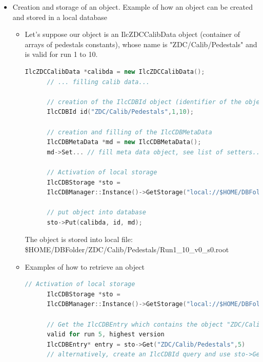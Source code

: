 \documentclass[12pt,a4paper,twoside]{article}
\begin{document}
{\begin{itemize}
  \begin{lstlisting}[language=C++]
    IlcCDBStorage *sto = 
    IlcCDBManager::Instance()->GetStorage("local://DBFolder"):
    
    IlcCDBStorage *dump = 
    IlcCDBManager::Instance()->GetStorage("dump:///data/DBFile.root;ReadOnly"):
  \end{lstlisting}

\item Creation and storage of an object. Example of how an 
  object can be created and stored in a local database

  \begin{itemize}
  \item Let's suppose our object is an IlcZDCCalibData object (container of 
    arrays of pedestals constants), whose name is 
    "ZDC/Calib/Pedestals" and is valid for run 1 to 10. 
    
    \begin{lstlisting}[language=C++]
      IlcZDCCalibData *calibda = new IlcZDCCalibData();
      // ... filling calib data...

      // creation of the IlcCDBId object (identifier of the object)
      IlcCDBId id("ZDC/Calib/Pedestals",1,10);

      // creation and filling of the IlcCDBMetaData
      IlcCDBMetaData *md = new IlcCDBMetaData();
      md->Set... // fill meta data object, see list of setters...

      // Activation of local storage
      IlcCDBStorage *sto = 
      IlcCDBManager::Instance()->GetStorage("local://$HOME/DBFolder");

      // put object into database
      sto->Put(calibda, id, md);
    \end{lstlisting}
    The object is stored into local file: 
    \$HOME/DBFolder/ZDC/Calib/Pedestals/Run1\_10\_v0\_s0.root

  \item Examples of how to retrieve an object

    \begin{lstlisting}[language=C++]
      // Activation of local storage
      IlcCDBStorage *sto =
      IlcCDBManager::Instance()->GetStorage("local://$HOME/DBFolder");
      
      // Get the IlcCDBEntry which contains the object "ZDC/Calib/Pedestals", 
      valid for run 5, highest version
      IlcCDBEntry* entry = sto->Get("ZDC/Calib/Pedestals",5)
      // alternatively, create an IlcCDBId query and use sto->Get(query) ...


\end{lstlisting}
\end{itemize}
\end{itemize}}
\end{document}
